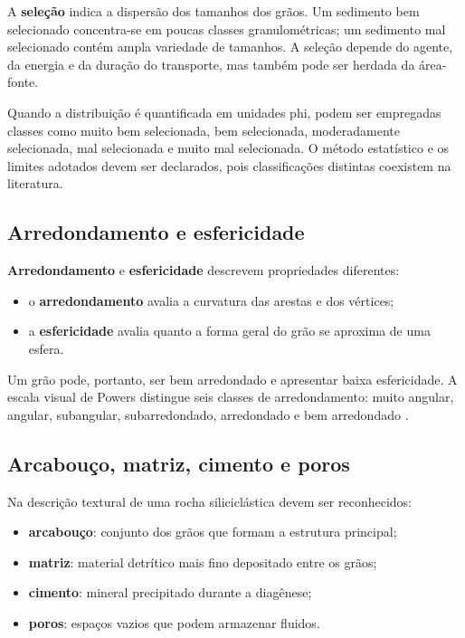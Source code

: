 A \textbf{seleção} indica a dispersão dos tamanhos dos grãos. Um sedimento bem selecionado concentra-se em poucas classes granulométricas; um sedimento mal selecionado contém ampla variedade de tamanhos. A seleção depende do agente, da energia e da duração do transporte, mas também pode ser herdada da área-fonte.

Quando a distribuição é quantificada em unidades phi, podem ser empregadas classes como muito bem selecionada, bem selecionada, moderadamente selecionada, mal selecionada e muito mal selecionada. O método estatístico e os limites adotados devem ser declarados, pois classificações distintas coexistem na literatura.

\subsection{Arredondamento e esfericidade}

\textbf{Arredondamento} e \textbf{esfericidade} descrevem propriedades diferentes:

\begin{itemize}
  \item o \textbf{arredondamento} avalia a curvatura das arestas e dos vértices;
  \item a \textbf{esfericidade} avalia quanto a forma geral do grão se aproxima de uma esfera.
\end{itemize}

Um grão pode, portanto, ser bem arredondado e apresentar baixa esfericidade. A escala visual de Powers distingue seis classes de arredondamento: muito angular, angular, subangular, subarredondado, arredondado e bem arredondado \parencite{powers1953}.

\subsection{Arcabouço, matriz, cimento e poros}

Na descrição textural de uma rocha siliciclástica devem ser reconhecidos:

\begin{itemize}
  \item \textbf{arcabouço}: conjunto dos grãos que formam a estrutura principal;
  \item \textbf{matriz}: material detrítico mais fino depositado entre os grãos;
  \item \textbf{cimento}: mineral precipitado durante a diagênese;
  \item \textbf{poros}: espaços vazios que podem armazenar fluidos.
\end{itemize}

